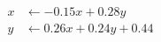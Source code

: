 \documentclass[preview]{standalone}
\begin{document}
\begin{align*}
x &\leftarrow -0.15 x + 0.28 y \\ y &\leftarrow 0.26 x + 0.24 y + 0.44
\end{align*}
\end{document}
